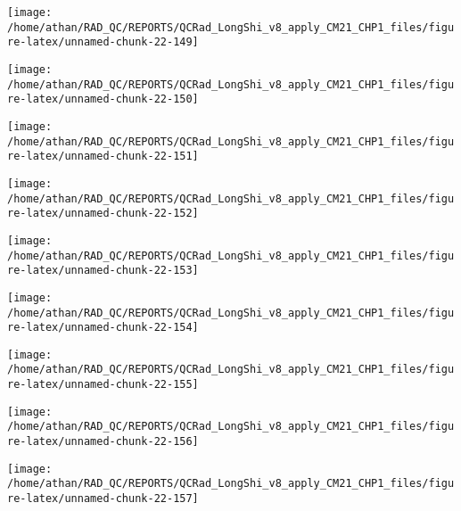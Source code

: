 \documentclass[
  10pt,
  a4paper,oneside]{article}
\begin{document}
\begin{center}\texttt{[image: /home/athan/RAD\_QC/REPORTS/QCRad\_LongShi\_v8\_apply\_CM21\_CHP1\_files/figure-latex/unnamed-chunk-22-149]} \end{center}

\begin{center}\texttt{[image: /home/athan/RAD\_QC/REPORTS/QCRad\_LongShi\_v8\_apply\_CM21\_CHP1\_files/figure-latex/unnamed-chunk-22-150]} \end{center}

\begin{center}\texttt{[image: /home/athan/RAD\_QC/REPORTS/QCRad\_LongShi\_v8\_apply\_CM21\_CHP1\_files/figure-latex/unnamed-chunk-22-151]} \end{center}

\begin{center}\texttt{[image: /home/athan/RAD\_QC/REPORTS/QCRad\_LongShi\_v8\_apply\_CM21\_CHP1\_files/figure-latex/unnamed-chunk-22-152]} \end{center}

\begin{center}\texttt{[image: /home/athan/RAD\_QC/REPORTS/QCRad\_LongShi\_v8\_apply\_CM21\_CHP1\_files/figure-latex/unnamed-chunk-22-153]} \end{center}

\begin{center}\texttt{[image: /home/athan/RAD\_QC/REPORTS/QCRad\_LongShi\_v8\_apply\_CM21\_CHP1\_files/figure-latex/unnamed-chunk-22-154]} \end{center}

\begin{center}\texttt{[image: /home/athan/RAD\_QC/REPORTS/QCRad\_LongShi\_v8\_apply\_CM21\_CHP1\_files/figure-latex/unnamed-chunk-22-155]} \end{center}

\begin{center}\texttt{[image: /home/athan/RAD\_QC/REPORTS/QCRad\_LongShi\_v8\_apply\_CM21\_CHP1\_files/figure-latex/unnamed-chunk-22-156]} \end{center}

\begin{center}\texttt{[image: /home/athan/RAD\_QC/REPORTS/QCRad\_LongShi\_v8\_apply\_CM21\_CHP1\_files/figure-latex/unnamed-chunk-22-157]} \end{center}
\end{document}
